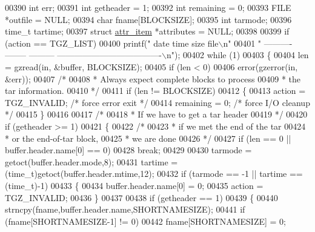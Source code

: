 \begin{DoxyCode}
{{{{00390   \textcolor{keywordtype}{int}    err;
00391   \textcolor{keywordtype}{int}    getheader = 1;
00392   \textcolor{keywordtype}{int}    remaining = 0;
00393   FILE   *outfile = NULL;
00394   \textcolor{keywordtype}{char}   fname[BLOCKSIZE];
00395   \textcolor{keywordtype}{int}    tarmode;
00396   time\_t tartime;
00397   \textcolor{keyword}{struct }\hyperlink{structattr__item}{attr\_item} *attributes = NULL;
00398 
00399   \textcolor{keywordflow}{if} (action == TGZ\_LIST)
00400     printf(\textcolor{stringliteral}{"    date      time     size                       file\(\backslash\)n"}
00401            \textcolor{stringliteral}{" ---------- -------- --------- -------------------------------------\(\backslash\)n"});
00402   \textcolor{keywordflow}{while} (1)
00403     \{
00404       len = gzread(in, &buffer, BLOCKSIZE);
00405       \textcolor{keywordflow}{if} (len < 0)
00406         error(gzerror(in, &err));
00407       \textcolor{comment}{/*}
00408 \textcolor{comment}{       * Always expect complete blocks to process}
00409 \textcolor{comment}{       * the tar information.}
00410 \textcolor{comment}{       */}
00411       \textcolor{keywordflow}{if} (len != BLOCKSIZE)
00412         \{
00413           action = TGZ\_INVALID; \textcolor{comment}{/* force error exit */}
00414           remaining = 0;        \textcolor{comment}{/* force I/O cleanup */}
00415         \}
00416 
00417       \textcolor{comment}{/*}
00418 \textcolor{comment}{       * If we have to get a tar header}
00419 \textcolor{comment}{       */}
00420       \textcolor{keywordflow}{if} (getheader >= 1)
00421         \{
00422           \textcolor{comment}{/*}
00423 \textcolor{comment}{           * if we met the end of the tar}
00424 \textcolor{comment}{           * or the end-of-tar block,}
00425 \textcolor{comment}{           * we are done}
00426 \textcolor{comment}{           */}
00427           \textcolor{keywordflow}{if} (len == 0 || buffer.header.name[0] == 0)
00428             \textcolor{keywordflow}{break};
00429 
00430           tarmode = getoct(buffer.header.mode,8);
00431           tartime = (time\_t)getoct(buffer.header.mtime,12);
00432           \textcolor{keywordflow}{if} (tarmode == -1 || tartime == (time\_t)-1)
00433             \{
00434               buffer.header.name[0] = 0;
00435               action = TGZ\_INVALID;
00436             \}
00437 
00438           \textcolor{keywordflow}{if} (getheader == 1)
00439             \{
00440               strncpy(fname,buffer.header.name,SHORTNAMESIZE);
00441               \textcolor{keywordflow}{if} (fname[SHORTNAMESIZE-1] != 0)
00442                   fname[SHORTNAMESIZE] = 0;
}}}}
\end{DoxyCode}
